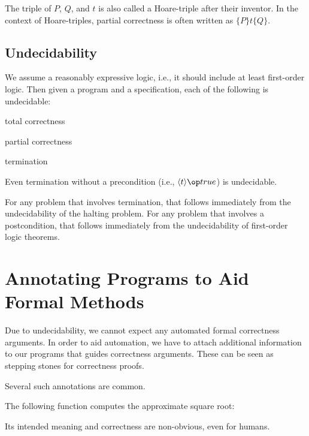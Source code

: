 The triple of $P$, $Q$, and $t$ is also called a Hoare-triple after their inventor. %
In the context of Hoare-triples, partial correctness is often written as $\{P\}t\{Q\}$.

\subsection{Undecidability}

We assume a reasonably expressive logic, i.e., it should include at least first-order logic.
Then given a program and a specification, each of the following is undecidable:
\begin{compactitem}
 \item total correctness
 \item partial correctness
 \item termination
\end{compactitem}
Even termination without a precondition (i.e., $\adia{t}{\true}$) is undecidable.

For any problem that involves termination, that follows immediately from the undecidability of the halting problem.
For any problem that involves a postcondition, that follows immediately from the undecidability of first-order logic theorems.

\section{Annotating Programs to Aid Formal Methods}

Due to undecidability, we cannot expect any automated formal correctness arguments.
In order to aid automation, we have to attach additional information to our programs that guides correctness arguments.
These can be seen as stepping stones for correctness proofs.

Several such annotations are common.

\begin{example}\label{ex:sd:sqrt}
The following function computes the approximate square root:
\begin{acode}
\end{acode}
Its intended meaning and correctness are non-obvious, even for humans.
\end{example}

